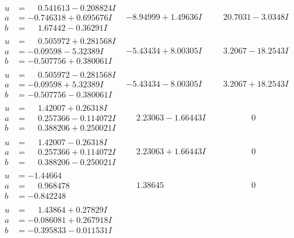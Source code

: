 \documentclass[1p]{elsarticle_modified}
\theoremstyle{definition}
\begin{document}
$$\begin{array}{c|c|c}
\begin{aligned}
u &= \phantom{-}0.541613 - 0.208824 I \\
a &= -0.746318 + 0.695676 I \\
b &= \phantom{-}1.67442 - 0.36291 I\end{aligned}
 & -8.94999 + 1.49636 I & \phantom{-}20.7031 - 3.0348 I \\ \hline\begin{aligned}
u &= \phantom{-}0.505972 + 0.281568 I \\
a &= -0.09598 - 5.32389 I \\
b &= -0.507756 + 0.380061 I\end{aligned}
 & -5.43434 + 8.00305 I & \phantom{-}3.2067 - 18.2543 I \\ \hline\begin{aligned}
u &= \phantom{-}0.505972 - 0.281568 I \\
a &= -0.09598 + 5.32389 I \\
b &= -0.507756 - 0.380061 I\end{aligned}
 & -5.43434 - 8.00305 I & \phantom{-}3.2067 + 18.2543 I \\ \hline\begin{aligned}
u &= \phantom{-}1.42007 + 0.26318 I \\
a &= \phantom{-}0.257366 - 0.114072 I \\
b &= \phantom{-}0.388206 + 0.250021 I\end{aligned}
 & \phantom{-}2.23063 - 1.66443 I & \phantom{-0.000000 } 0 \\ \hline\begin{aligned}
u &= \phantom{-}1.42007 - 0.26318 I \\
a &= \phantom{-}0.257366 + 0.114072 I \\
b &= \phantom{-}0.388206 - 0.250021 I\end{aligned}
 & \phantom{-}2.23063 + 1.66443 I & \phantom{-0.000000 } 0 \\ \hline\begin{aligned}
u &= -1.44664\phantom{ +0.000000I} \\
a &= \phantom{-}0.968478\phantom{ +0.000000I} \\
b &= -0.842248\phantom{ +0.000000I}\end{aligned}
 & \phantom{-}1.38645\phantom{ +0.000000I} & \phantom{-0.000000 } 0 \\ \hline\begin{aligned}
u &= \phantom{-}1.43864 + 0.27829 I \\
a &= -0.086081 + 0.267918 I \\
b &= -0.395833 - 0.011531 I\end{aligned}

\end{array}$$
\end{document}
